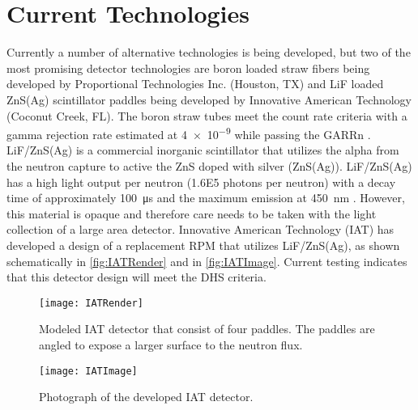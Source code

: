 \section{Current Technologies}
\label{sec:CurrentTechnologies}
Currently a number of alternative technologies is being developed, but two of the most promising detector technologies are boron loaded straw fibers being developed by Proportional Technologies Inc. (Houston, TX) and LiF loaded ZnS(Ag) scintillator paddles being developed by Innovative American Technology (Coconut Creek, FL).
The boron straw tubes meet the count rate criteria with a gamma rejection rate estimated at \num{4e-9} while passing the GARRn \cite{kouzes_boron-lined_2012}.
LiF/ZnS(Ag) is a commercial inorganic scintillator that utilizes the alpha from the  neutron capture to active the ZnS doped with silver (ZnS(Ag)). 
LiF/ZnS(Ag) has a high light output per neutron (\num{1.6E5} photons per neutron) with a decay time of approximately \SI{100}{\micro\second} and the maximum emission at \SI{450}{\nm} \cite{carel_w.e_inorganic-scintillator_2001}.
However, this material is opaque and therefore care needs to be taken with the light collection of a large area detector.
Innovative American Technology (IAT) has developed a design of a replacement RPM that utilizes LiF/ZnS(Ag), as shown schematically in \autoref{fig:IATRender} and in \autoref{fig:IATImage}.
Current testing indicates that this detector design will meet the DHS criteria\cite{kouzes_lithium_2010}.
\begin{figure}
  \centering
  \texttt{[image: IATRender]}
	\caption[Rendering of IAT Neutron Detector]{Modeled IAT detector that consist of four paddles.  The paddles are angled to expose a larger surface to the neutron flux\cite{pnnl_22228}.}
	\label{fig:IATRender}
\end{figure}
\begin{figure}
  \centering
  \texttt{[image: IATImage]}
	\caption[Photograph of IAT Neutron Detector]{Photograph of the developed IAT detector\cite{pnnl_22228}.}
	\label{fig:IATImage}
\end{figure}

